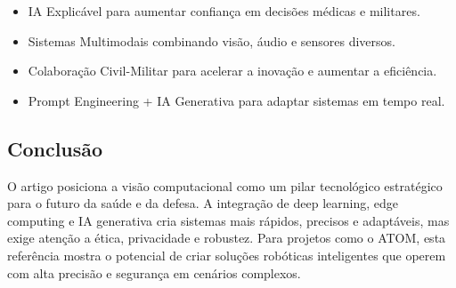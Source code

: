 \documentclass{article}
\begin{document}
\begin{itemize}
    \item IA Explicável para aumentar confiança em decisões médicas e militares.
    \item Sistemas Multimodais combinando visão, áudio e sensores diversos.
    \item Colaboração Civil-Militar para acelerar a inovação e aumentar a eficiência.
    \item Prompt Engineering + IA Generativa para adaptar sistemas em tempo real.
\end{itemize}

\subsection*{Conclusão}

O artigo posiciona a visão computacional como um pilar tecnológico estratégico para o futuro da saúde e da defesa. A integração de deep learning, edge computing e IA generativa cria sistemas mais rápidos, precisos e adaptáveis, mas exige atenção a ética, privacidade e robustez. Para projetos como o ATOM, esta referência mostra o potencial de criar soluções robóticas inteligentes que operem com alta precisão e segurança em cenários complexos.
\end{document}
